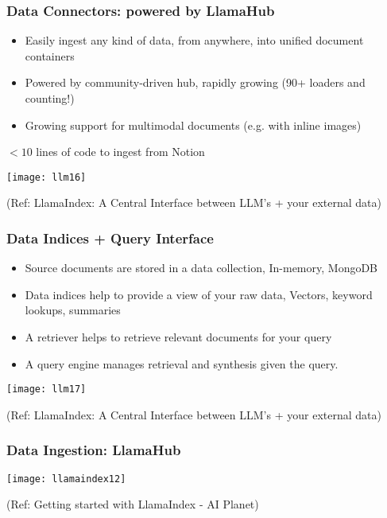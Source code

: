 \begin{frame}[fragile]\frametitle{Data Connectors: powered by LlamaHub}


\begin{itemize}
\item Easily ingest any kind of data, from anywhere, into unified document containers 
\item Powered by community-driven hub, rapidly growing (90+ loaders and counting!)
\item Growing support for multimodal documents (e.g. with inline images)
\end{itemize}	

$<10$ lines of code to ingest from Notion

\begin{center}
\texttt{[image: llm16]}

{\tiny (Ref: LlamaIndex: A Central Interface between LLM's + your external data)}
\end{center}
\end{frame}

\begin{frame}[fragile]\frametitle{Data Indices + Query Interface}


\begin{itemize}
\item Source documents are stored in a data collection, In-memory, MongoDB
\item Data indices help to provide a view of your raw data, Vectors, keyword lookups, summaries
\item A retriever helps to retrieve relevant documents for your query
\item A query engine manages retrieval and synthesis given the query. 
\end{itemize}	

\begin{center}
\texttt{[image: llm17]}

{\tiny (Ref: LlamaIndex: A Central Interface between LLM's + your external data)}
\end{center}

\end{frame}

\begin{frame}[fragile]\frametitle{Data Ingestion: LlamaHub}


\begin{center}
\texttt{[image: llamaindex12]}

{\tiny (Ref: Getting started with LlamaIndex - AI Planet)}
\end{center}
\end{frame}


